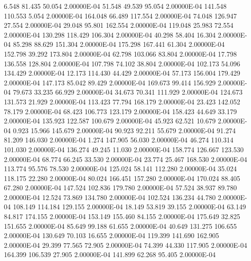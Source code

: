      6.548    81.435    50.054  2.00000E-04
    51.548    49.539    95.054  2.00000E-04
   141.548   110.553     5.054  2.00000E-04
   164.048    66.489   117.554  2.00000E-04
    74.048   126.947    27.554  2.00000E-04
    29.048    95.801   162.554  2.00000E-04
   119.048    25.983    72.554  2.00000E-04
   130.298   118.429   106.304  2.00000E-04
    40.298    58.404    16.304  2.00000E-04
    85.298    88.629   151.304  2.00000E-04
   175.298   167.441    61.304  2.00000E-04
   152.798    39.292   173.804  2.00000E-04
    62.798   103.066    83.804  2.00000E-04
    17.798   136.558   128.804  2.00000E-04
   107.798    74.102    38.804  2.00000E-04
   102.173    54.096   134.429  2.00000E-04
    12.173   114.430    44.429  2.00000E-04
    57.173   156.004   179.429  2.00000E-04
   147.173    85.042    89.429  2.00000E-04
   169.673    99.414   156.929  2.00000E-04
    79.673    33.235    66.929  2.00000E-04
    34.673    70.341   111.929  2.00000E-04
   124.673   131.573    21.929  2.00000E-04
   113.423    77.794   168.179  2.00000E-04
    23.423   142.052    78.179  2.00000E-04
    68.423   106.773   123.179  2.00000E-04
   158.423    44.649    33.179  2.00000E-04
   135.923   122.587   100.679  2.00000E-04
    45.923    62.521    10.679  2.00000E-04
     0.923    15.966   145.679  2.00000E-04
    90.923    92.211    55.679  2.00000E-04
    91.274    81.209   146.030  2.00000E-04
     1.274   147.905    56.030  2.00000E-04
    46.274   110.314   101.030  2.00000E-04
   136.274    49.245    11.030  2.00000E-04
   158.774   126.667   123.530  2.00000E-04
    68.774    66.245    33.530  2.00000E-04
    23.774    25.467   168.530  2.00000E-04
   113.774    95.576    78.530  2.00000E-04
   125.024    58.141   112.280  2.00000E-04
    35.024   118.175    22.280  2.00000E-04
    80.024   166.451   157.280  2.00000E-04
   170.024    88.405    67.280  2.00000E-04
   147.524   102.836   179.780  2.00000E-04
    57.524    38.937    89.780  2.00000E-04
    12.524    73.869   134.780  2.00000E-04
   102.524   136.234    44.780  2.00000E-04
   108.149   114.184   129.155  2.00000E-04
    18.149    53.819    39.155  2.00000E-04
    63.149    84.817   174.155  2.00000E-04
   153.149   155.460    84.155  2.00000E-04
   175.649    32.825   151.655  2.00000E-04
    85.649    99.188    61.655  2.00000E-04
    40.649   131.275   106.655  2.00000E-04
   130.649    70.103    16.655  2.00000E-04
   119.399   141.690   162.905  2.00000E-04
    29.399    77.565    72.905  2.00000E-04
    74.399    44.330   117.905  2.00000E-04
   164.399   106.539    27.905  2.00000E-04
   141.899    62.268    95.405  2.00000E-04

